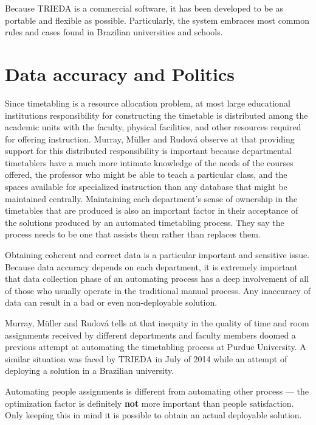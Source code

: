 Because TRIEDA is a commercial software, it has been developed to be as portable and flexible as possible. Particularly, the system embraces most common rules and cases found in Brazilian universities and schools.


\section{Data accuracy and Politics}
\label{sec:accuracy}

Since timetabling is a resource allocation problem, at most large educational institutions responsibility for constructing the timetable is distributed among the academic units with the faculty, physical facilities, and other resources required for offering instruction. Murray, M\"{u}ller and Rudov\'{a} observe at \cite{Murray2007} that providing support for this distributed responsibility is important because departmental timetablers have a much more intimate knowledge of the needs of the courses offered, the professor who might be able to teach a particular class, and the spaces available for specialized instruction than any database that might be maintained centrally. Maintaining each department's sense of ownership in the timetables that are produced is also an important factor in their acceptance of the solutions produced by an automated timetabling process. They say the process needs to be one that assists them rather than replaces them.

Obtaining coherent and correct data is a particular important and sensitive issue. Because data accuracy depends on each department, it is extremely important that data collection phase of an automating process has a deep involvement of all of those who usually operate in the traditional manual process. Any inaccuracy of data can result in a bad or even non-deployable solution.


Murray, M\"{u}ller and Rudov\'{a} tells at \cite{Murray2007} that inequity in the quality of time and room assignments received by different departments and faculty members doomed a previous attempt at automating the timetabling process at Purdue University. A similar situation was faced by TRIEDA in July of 2014 while an attempt of deploying a solution in a Brazilian university.

Automating people assignments is different from automating other process --- the optimization factor is definitely \textbf{not} more important than people satisfaction. Only keeping this in mind it is possible to obtain an actual deployable solution.


